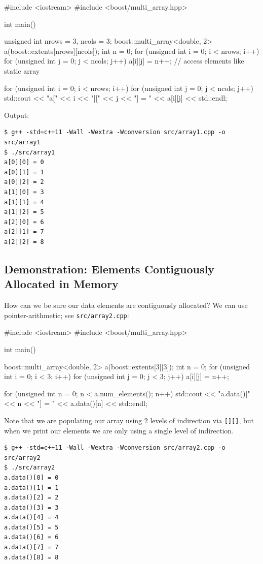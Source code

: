 \documentclass[12pt,letterpaper,twoside]{article}
\begin{document}
\begin{cpp}
#include <iostream>
#include <boost/multi_array.hpp>

int main() {
  unsigned int nrows = 3, ncols = 3;
  boost::multi_array<double, 2> a(boost::extents[nrows][ncols]);
  int n = 0;
  for (unsigned int i = 0; i < nrows; i++)
    for (unsigned int j = 0; j < ncols; j++)
      a[i][j] = n++; // access elements like static array

  for (unsigned int i = 0; i < nrows; i++)
    for (unsigned int j = 0; j < ncols; j++)
      std::cout << "a[" << i << "][" << j << "] = " << a[i][j] << std::endl;
}
\end{cpp}

Output:

\begin{verbatim}
$ g++ -std=c++11 -Wall -Wextra -Wconversion src/array1.cpp -o src/array1
$ ./src/array1
a[0][0] = 0
a[0][1] = 1
a[0][2] = 2
a[1][0] = 3
a[1][1] = 4
a[1][2] = 5
a[2][0] = 6
a[2][1] = 7
a[2][2] = 8
\end{verbatim}

\subsection{Demonstration: Elements Contiguously Allocated in Memory} How can we be sure
our data elements are contiguously allocated? We can use pointer-arithmetic; see
\texttt{src/array2.cpp}:

\begin{cpp}
#include <iostream>
#include <boost/multi_array.hpp>

int main() {
  boost::multi_array<double, 2> a(boost::extents[3][3]);
  int n = 0;
  for (unsigned int i = 0; i < 3; i++)
    for (unsigned int j = 0; j < 3; j++)
      a[i][j] = n++;

  for (unsigned int n = 0; n < a.num_elements(); n++)
    std::cout << "a.data()[" << n << "] = " << a.data()[n] << std::endl;
}
\end{cpp}

Note that we are populating our array using 2 levels of indirection via \texttt{[][]}, but when we
print our elements we are only using a single level of indirection.

\begin{verbatim}
$ g++ -std=c++11 -Wall -Wextra -Wconversion src/array2.cpp -o src/array2
$ ./src/array2
a.data()[0] = 0
a.data()[1] = 1
a.data()[2] = 2
a.data()[3] = 3
a.data()[4] = 4
a.data()[5] = 5
a.data()[6] = 6
a.data()[7] = 7
a.data()[8] = 8
\end{verbatim}
\end{document}
